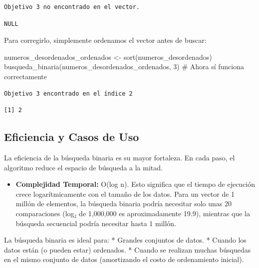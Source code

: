 \documentclass[
  spanish,
  letterpaper,
  DIV=11,
  numbers=noendperiod]{scrreprt}
\newenvironment{Shaded}{\begin{snugshade}}{\end{snugshade}}
\newcommand{\CommentTok}[1]{\textcolor[rgb]{0.37,0.37,0.37}{#1}}
\newcommand{\DecValTok}[1]{\textcolor[rgb]{0.68,0.00,0.00}{#1}}
\newcommand{\FunctionTok}[1]{\textcolor[rgb]{0.28,0.35,0.67}{#1}}
\newcommand{\NormalTok}[1]{\textcolor[rgb]{0.00,0.23,0.31}{#1}}
\newcommand{\OtherTok}[1]{\textcolor[rgb]{0.00,0.23,0.31}{#1}}
\providecommand{\tightlist}{%
  \setlength{\itemsep}{0pt}\setlength{\parskip}{0pt}}
\begin{document}
\begin{verbatim}
Objetivo 3 no encontrado en el vector.
\end{verbatim}

\begin{verbatim}
NULL
\end{verbatim}

Para corregirlo, simplemente ordenamos el vector antes de buscar:

\begin{Shaded}
\begin{Highlighting}[]
\NormalTok{numeros\_desordenados\_ordenados }\OtherTok{\textless{}{-}} \FunctionTok{sort}\NormalTok{(numeros\_desordenados)}
\FunctionTok{busqueda\_binaria}\NormalTok{(numeros\_desordenados\_ordenados, }\DecValTok{3}\NormalTok{) }\CommentTok{\# Ahora sí funciona correctamente}
\end{Highlighting}
\end{Shaded}

\begin{verbatim}
Objetivo 3 encontrado en el índice 2
\end{verbatim}

\begin{verbatim}
[1] 2
\end{verbatim}

\subsection{Eficiencia y Casos de
Uso}\label{eficiencia-y-casos-de-uso-1}

La eficiencia de la búsqueda binaria es su mayor fortaleza. En cada
paso, el algoritmo reduce el espacio de búsqueda a la mitad.

\begin{itemize}
\tightlist
\item
  \textbf{Complejidad Temporal:} O(log n). Esto significa que el tiempo
  de ejecución crece logarítmicamente con el tamaño de los datos. Para
  un vector de 1 millón de elementos, la búsqueda binaria podría
  necesitar solo unas 20 comparaciones (log₂ de 1,000,000 es
  aproximadamente 19.9), mientras que la búsqueda secuencial podría
  necesitar hasta 1 millón.
\end{itemize}

La búsqueda binaria es ideal para: * Grandes conjuntos de datos. *
Cuando los datos están (o pueden estar) ordenados. * Cuando se realizan
muchas búsquedas en el mismo conjunto de datos (amortizando el costo de
ordenamiento inicial).
\end{document}
